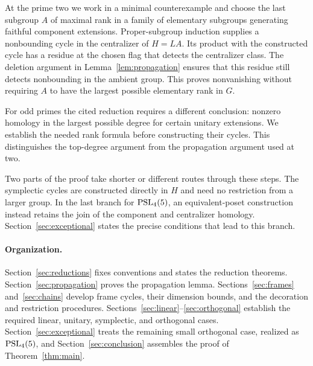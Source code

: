 At the prime two we work in a minimal counterexample and choose the
last subgroup $A$ of maximal rank in a family of elementary subgroups
generating faithful component extensions. Proper-subgroup induction supplies a
nonbounding cycle in the centralizer of $H=LA$. Its product with the
constructed cycle has a residue at the chosen flag that detects the
centralizer class. The deletion argument in
Lemma~\ref{lem:propagation} ensures that this residue still detects
nonbounding in the ambient group. This proves nonvanishing without
requiring $A$ to have the largest possible elementary rank in $G$.

For odd primes the cited reduction requires a different conclusion:
nonzero homology in the largest possible degree for certain unitary
extensions. We establish the needed rank formula before constructing
their cycles. This distinguishes the top-degree argument from the
propagation argument used at two.

Two parts of the proof take shorter or different routes through these
steps. The symplectic cycles are constructed directly in $H$ and need
no restriction from a larger group. In the last branch for
$\operatorname{PSL}_4(5)$, an equivalent-poset construction instead retains the join
of the component and centralizer homology. Section~\ref{sec:exceptional}
states the precise conditions that lead to this branch.

\paragraph{Organization.}
Section~\ref{sec:reductions} fixes conventions and states the reduction
theorems. Section~\ref{sec:propagation} proves the propagation lemma.
Sections~\ref{sec:frames} and~\ref{sec:chains} develop frame cycles,
their dimension bounds, and the decoration and restriction procedures.
Sections~\ref{sec:linear}--\ref{sec:orthogonal} establish the required
linear, unitary, symplectic, and orthogonal cases.
Section~\ref{sec:exceptional} treats the remaining small orthogonal
case, realized as $\operatorname{PSL}_4(5)$, and Section~\ref{sec:conclusion} assembles
the proof of Theorem~\ref{thm:main}.
